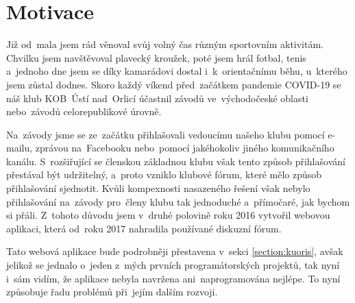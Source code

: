 \section{Motivace}\label{section:motivation}
Již od~mala jsem rád věnoval svůj volný čas různým sportovním aktivitám. Chvilku jsem navštěvoval plavecký kroužek, poté jsem hrál fotbal, tenis a~jednoho dne jsem se díky kamarádovi dostal i~k~orientačnímu běhu, u~kterého jsem zůstal dodnes. Skoro každý víkend před~začátkem pandemie COVID-19 se náš klub KOB~Ústí nad~Orlicí účastnil závodů ve~východočeské oblasti nebo~závodů celorepublikové úrovně.

Na~závody jsme se ze~začátku přihlašovali vedoucímu našeho klubu pomocí e-mailu, zprávou na~Facebooku nebo~pomocí jakéhokoliv jiného komunikačního kanálu. S~rozšiřující se členskou základnou klubu však tento způsob přihlašování přestával být udržitelný, a~proto vzniklo klubové fórum, které mělo způsob přihlašování sjednotit. Kvůli kompexnosti nasazeného řešení však nebylo přihlašování na~závody pro~členy klubu tak jednoduché a~přímočaré, jak bychom si přáli. Z~tohoto důvodu jsem v~druhé polovině roku 2016 vytvořil webovou aplikaci, která od~roku 2017 nahradila používané diskuzní fórum.

Tato webová aplikace bude podrobněji přestavena v~sekci \ref{section:kuoris}, avšak jelikož se jednalo o~jeden z~mých prvních programátorských projektů, tak nyní i~sám vidím, že aplikace nebyla navržena ani~naprogramována nejlépe. To nyní způsobuje řadu problémů při~jejím dalším rozvoji.
